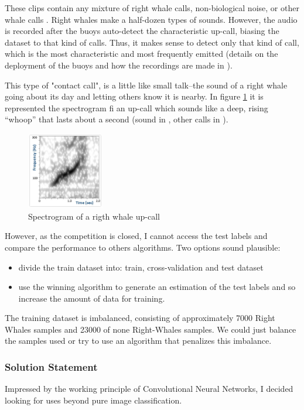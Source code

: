 \documentclass[]{article}
\begin{document}
These clips contain any mixture of right whale calls, non-biological noise, or other whale calls \cite{CornellWeb, CornellWeb2}.  Right whales make a half-dozen types of sounds. However, the audio is recorded after the buoys auto-detect the characteristic up-call, biasing the dataset to that kind of calls. Thus, it makes sense to detect only that kind of call, which is the most  characteristic and most frequently emitted (details on the deployment of the buoys and how the recordings are made in \cite{McDonald2002}).

This type of "contact call",  is a little like small talk--the sound of a right whale going about its day and letting others know it is nearby. In figure \ref{img:upcall} it is represented the spectrogram fi an up-call which sounds like a deep, rising “whoop” that lasts about a second (sound in \cite{CornellWeb}, other calls in \cite{CornellWeb2}).

\begin{figure}[htpb!]
\centering
\includegraphics[width= 0.3\textwidth]{images/sound_upcall_quiet.jpg}
\caption{Spectrogram of a rigth whale up-call \cite{CornellWeb} \label{img:upcall}}
\end{figure}

However, as the competition is closed, I cannot access the test labels and compare the performance to others algorithms. Two options sound plausible:
\begin{itemize}
	\item divide the train dataset into: train, cross-validation and test dataset
	\item use the winning algorithm to generate an estimation of the test labels and so increase the amount of data for training.
\end{itemize}

The training dataset is imbalanced, consisting of approximately 7000 Right Whales samples and 23000 of none Right-Whales samples. We could just balance the samples used or try to use an algorithm that penalizes this imbalance.

\subsubsection{Solution Statement}\label{solution-statement}
Impressed by the working principle of Convolutional Neural Networks, I decided looking for uses beyond pure image classification. 
\end{document}
